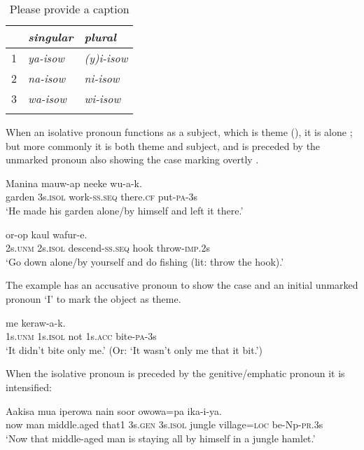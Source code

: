 \begin{table}
\caption{Please provide a caption}
\label{} 
\begin{tabular}{l>{\itshape}l>{\itshape}l}
\mytoprule
&\upshape singular &\upshape plural\\
\midrule
1 &ya-isow &(y)i-isow\\
2 &na-isow &ni-isow\\
3 &wa-isow &wi-isow\\
\mybottomrule
\end{tabular}
\end{table}


When an isolative pronoun functions as a subject, which is  theme (), it is alone ; but more commonly it is both theme and subject, and is preceded by the unmarked pronoun also showing the case marking overtly . 

\ea%
\label{ex:3:x599}
\gll Manina  mauw-ap neeke wu-a-k. \\
garden 3s.\textsc{isol} work-\textsc{ss}.\textsc{seq} there.\textsc{cf} put-\textsc{pa}-3s\\
\glt`He made his garden alone/by himself and left it there.'
\z

\ea%
\label{ex:3:x600}
\gll {}  or-op kaul wafur-e. \\
2s.\textsc{unm} 2s.\textsc{isol} descend-\textsc{ss}.\textsc{seq} hook throw-\textsc{imp}.2s\\
\glt`Go down alone/by yourself and do fishing (lit: throw the hook).'
\z

The example  has an accusative pronoun to show the case and an initial unmarked pronoun  `I' to mark the object as theme.

\ea%
\label{ex:3:x601}
\gll {}  me  keraw-a-k. \\
1s.\textsc{unm} 1s.\textsc{isol} not 1s.\textsc{acc} bite-\textsc{pa}-3s\\
\glt`It didn't bite only me.' (Or: `It wasn't only me that it bit.')
\z

When the isolative pronoun is preceded by the genitive/emphatic pronoun it is intensified:

\ea%
\label{ex:3:x1813}
\gll Aakisa mua iperowa nain   soor owowa=pa ika-i-ya.\\
now man middle.aged that1 3s.\textsc{gen} 3s.\textsc{isol} jungle village=\textsc{loc} be-Np-\textsc{pr}.3s\\
\glt`Now that middle-aged man is staying all by himself in a jungle hamlet.'
\z

